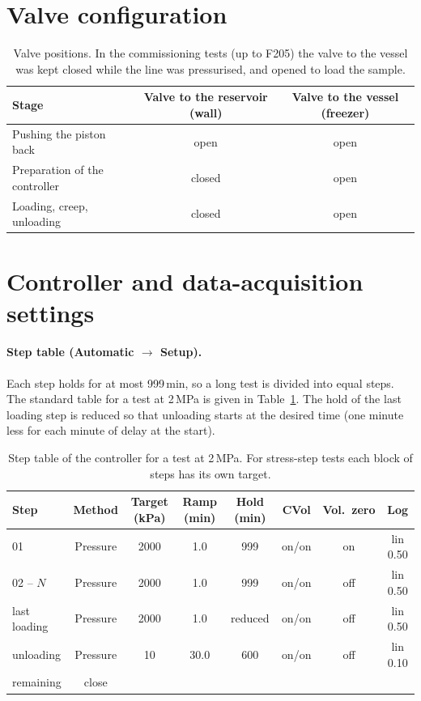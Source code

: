 \section{Valve configuration}
\begin{table}[H]
\centering
\small
\begin{tabular}{@{}lcc@{}}
\toprule
Stage & Valve to the reservoir (wall) & Valve to the vessel (freezer) \\
\midrule
Pushing the piston back & open & open \\
Preparation of the controller & closed & open \\
Loading, creep, unloading & closed & open \\
\bottomrule
\end{tabular}
\caption{Valve positions. In the commissioning tests (up to F205) the valve to the vessel was kept closed while the line was pressurised, and opened to load the sample.}
\end{table}

\section{Controller and data-acquisition settings}
\paragraph{Step table (Automatic $\to$ Setup).} Each step holds for at most 999\,min, so a long test is divided into equal steps. The standard table for a test at 2\,MPa is given in Table~\ref{tab:step_table}. The hold of the last loading step is reduced so that unloading starts at the desired time (one minute less for each minute of delay at the start).

\begin{table}[H]
\centering
\small
\begin{tabular}{@{}lccccccc@{}}
\toprule
Step & Method & Target (kPa) & Ramp (min) & Hold (min) & CVol & Vol.\ zero & Log \\
\midrule
01 & Pressure & 2000 & 1.0 & 999 & on/on & on & lin 0.50 \\
02 -- $N$ & Pressure & 2000 & 1.0 & 999 & on/on & off & lin 0.50 \\
last loading & Pressure & 2000 & 1.0 & reduced & on/on & off & lin 0.50 \\
unloading & Pressure & 10 & 30.0 & 600 & on/on & off & lin 0.10 \\
remaining & close & & & & & & \\
\bottomrule
\end{tabular}
\caption{Step table of the controller for a test at 2\,MPa. For stress-step tests each block of steps has its own target.}
\label{tab:step_table}
\end{table}

